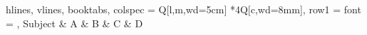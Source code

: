 \documentclass{article}
\begin{document}
	
	
	\begin{tblr}{
			hlines, vlines, booktabs,
			colspec = {Q[l,m,wd=5cm]  *{4}{Q[c,wd=8mm]}},
			row{1} = {font = \bfseries\itshape\footnotesize},
		}
		Subject & A & B & C & D \\
	\end{tblr}
\end{document}
